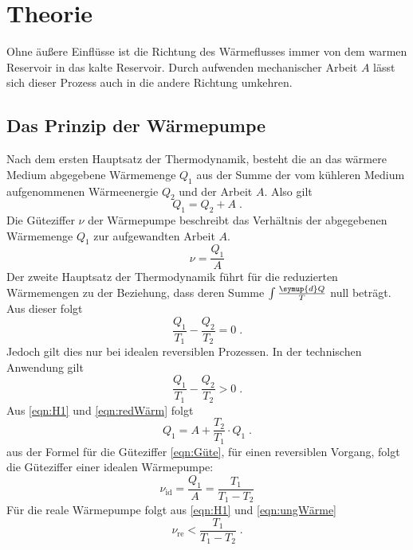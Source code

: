 \section{Theorie}
\label{sec:Theorie}
Ohne äußere Einflüsse ist die Richtung des Wärmeflusses immer von dem warmen Reservoir in das kalte Reservoir.
Durch aufwenden mechanischer Arbeit $A$ lässt sich dieser Prozess auch in die andere Richtung umkehren.
\subsection{Das Prinzip der Wärmepumpe}
Nach dem ersten Hauptsatz der Thermodynamik, besteht die an das wärmere Medium abgegebene Wärmemenge $Q_1$ aus der Summe der vom kühleren Medium aufgenommenen
Wärmeenergie $Q_2$ und der Arbeit $A$. Also gilt
\begin{equation}
    Q_1=Q_2+A \; \text{.}
    \label{eqn:H1}
\end{equation}
Die Güteziffer $\nu$ der Wärmepumpe beschreibt das Verhältnis der abgegebenen
Wärmemenge $Q_1$ zur aufgewandten Arbeit $A$.
\begin{equation}
    \nu=\frac{Q_1}{A}
    \label{eqn:Güte}
\end{equation}
Der zweite Hauptsatz der Thermodynamik führt für die reduzierten Wärmemengen 
zu der Beziehung, dass deren Summe $\int \frac{\symup{d}Q}{T}$ null beträgt. 
Aus dieser folgt
\begin{equation}
    \frac{Q_1}{T_1} - \frac{Q_2}{T_2} = 0 \; \text{.}
    \label{eqn:redWärm}
\end{equation}
Jedoch gilt dies nur bei idealen reversiblen Prozessen. In der technischen Anwendung gilt
\begin{equation}
    \frac{Q_1}{T_1} - \frac{Q_2}{T_2} > 0 \; \text{.}
    \label{eqn:ungWärme}
\end{equation}
Aus \ref{eqn:H1} und \ref{eqn:redWärm} folgt
\begin{equation*}
    Q_1 = A + \frac{T_2}{T_1} \cdot Q_1 \; \text{.}
\end{equation*}
aus der Formel für die Güteziffer \ref{eqn:Güte}, für einen reversiblen Vorgang, folgt die Güteziffer einer idealen Wärmepumpe:
\begin{equation}
    \nu_\text{id} = \frac{Q_1}{A} = \frac{T_1}{T_1 - T_2}
    \label{eqn:Id}
\end{equation}
Für die reale Wärmepumpe folgt aus \ref{eqn:H1} und \ref{eqn:ungWärme}
\begin{equation}
    \nu_\text{re} < \frac{T_1}{T_1 - T_2} \; \text{.}
    \label{eqn:Re}
\end{equation}
